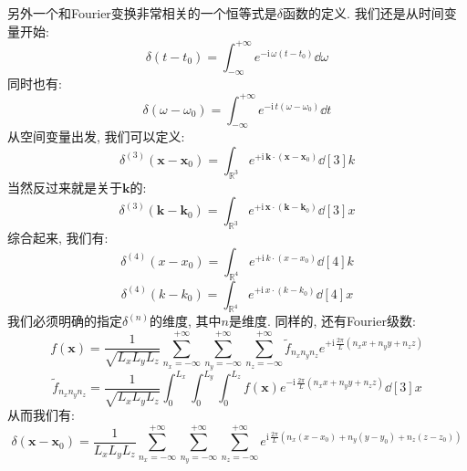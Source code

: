 另外一个和Fourier变换非常相关的一个恒等式是$\delta$函数的定义.
我们还是从时间变量开始:
\begin{equation}
  \delta(t-t_0) = \int_{-\infty}^{+\infty} e^{-\mathrm{i}\, \omega (t - t_0)} \dd{\omega}
\end{equation}
同时也有:
\begin{equation}
  \delta(\omega-\omega_0) = \int_{-\infty}^{+\infty} e^{-\mathrm{i}\, t (\omega-\omega_0)} \dd{t}
\end{equation}
从空间变量出发, 我们可以定义:
\begin{equation}
  \delta^{(3)}(\bm{x}-\bm{x}_0) = \int_{\mathbb{R}^3} e^{+\mathrm{i}\, \bm{k} \cdot (\bm{x} - \bm{x}_0)} \dd[3]{k}
\end{equation}
当然反过来就是关于$\bm{k}$的:
\begin{equation}
  \delta^{(3)}(\bm{k}-\bm{k}_0) = \int_{\mathbb{R}^3} e^{+\mathrm{i}\, \bm{x} \cdot (\bm{k} - \bm{k}_0)} \dd[3]{x}
\end{equation}
综合起来, 我们有:
\begin{equation}
  \delta^{(4)}(x-x_0) = \int_{\mathbb{R}^4} e^{+\mathrm{i}\, k \cdot (x - x_0)} \dd[4]{k}
\end{equation}
\begin{equation}
  \delta^{(4)}(k-k_0) = \int_{\mathbb{R}^4} e^{+\mathrm{i}\, x \cdot (k - k_0)} \dd[4]{x}
\end{equation}
我们必须明确的指定$\delta^{(n)}$的维度, 其中$n$是维度.
同样的, 还有Fourier级数:
\begin{equation}
  f(\bm{x}) = \frac{1}{\sqrt{L_x L_y L_z}} \sum_{n_x=-\infty}^{+\infty} \sum_{n_y=-\infty}^{+\infty} \sum_{n_z=-\infty}^{+\infty} \tilde{f}_{n_x n_y n_z} e^{+\mathrm{i}\, \frac{2\pi}{L} (n_x x + n_y y + n_z z)}
\end{equation}
\begin{equation}
  \tilde{f}_{n_x n_y n_z} = \frac{1}{\sqrt{L_x L_y L_z}} \int_0^{L_x} \int_0^{L_y} \int_0^{L_z} f(\bm{x}) e^{-\mathrm{i}\, \frac{2\pi}{L} (n_x x + n_y y + n_z z)} \dd[3]{x}
\end{equation}
从而我们有:
\begin{equation}
  \delta(\bm{x}-\bm{x}_0) = \frac{1}{L_x L_y L_z} \sum_{n_x=-\infty}^{+\infty} \sum_{n_y=-\infty}^{+\infty} \sum_{n_z=-\infty}^{+\infty} e^{\mathrm{i}\, \frac{2\pi}{L} (n_x (x-x_0) + n_y (y-y_0) + n_z (z-z_0))}
\end{equation}


